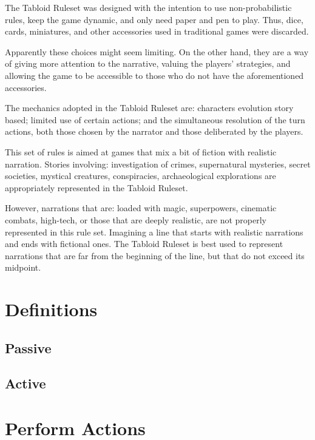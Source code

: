 \documentclass[11pt]{article}
\begin{document}
\begin{multicols}{2}
The Tabloid Ruleset was designed with the intention to use non-probabilistic rules, keep the game dynamic, and only need paper and pen to play. Thus, dice, cards, miniatures, and other accessories used in traditional games were discarded.

Apparently these choices might seem limiting. On the other hand, they are a way of giving more attention to the narrative, valuing the players' strategies, and allowing the game to be accessible to those who do not have the aforementioned accessories.

The mechanics adopted in the Tabloid Ruleset are: characters evolution story based; limited use of certain actions; and the simultaneous resolution of the turn actions, both those chosen by the narrator and those deliberated by the players.

This set of rules is aimed at games that mix a bit of fiction with realistic narration. Stories involving: investigation of crimes, supernatural mysteries, secret societies, mystical creatures, conspiracies, archaeological explorations are appropriately represented in the Tabloid Ruleset.

However, narrations that are: loaded with magic, superpowers, cinematic combats, high-tech, or those that are deeply realistic, are not properly represented in this rule set. Imagining a line that starts with realistic narrations and ends with fictional ones. The Tabloid Ruleset is best used to represent narrations that are far from the beginning of the line, but that do not exceed its midpoint.

\section{Definitions}

\lipsum[1]

\subsection{Passive}

\lipsum[1]

\subsection{Active}

\lipsum[1]

\section{Perform Actions}


\end{multicols}
\end{document}
